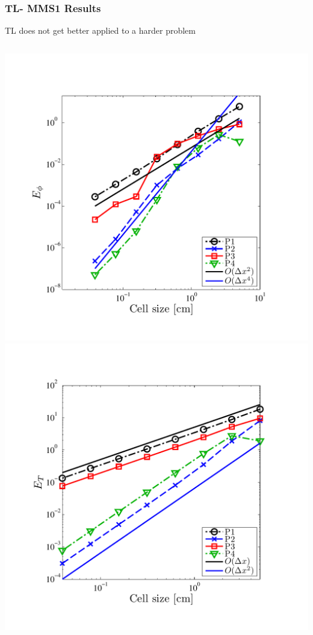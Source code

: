 \documentclass{beamer}
\begin{document}
\begin{frame}
\frametitle{TL- MMS1 Results}
TL does not get better applied to a harder problem
\begin{columns}[t]
\centering
\includegraphics[width=\textwidth,trim=0.25in  0.2in 0.75in 0.5in,clip=true]{../chapter6_grey_radtran/Dissertation_Data/MMS2_TL_phi_L2.pdf}
\centering
\includegraphics[width=\textwidth,trim=0.25in  0.2in 0.75in 0.5in,clip=true]{../chapter6_grey_radtran/Dissertation_Data/MMS2_TL_temp_L2.pdf}
\end{columns}
\end{frame}
\end{document}
